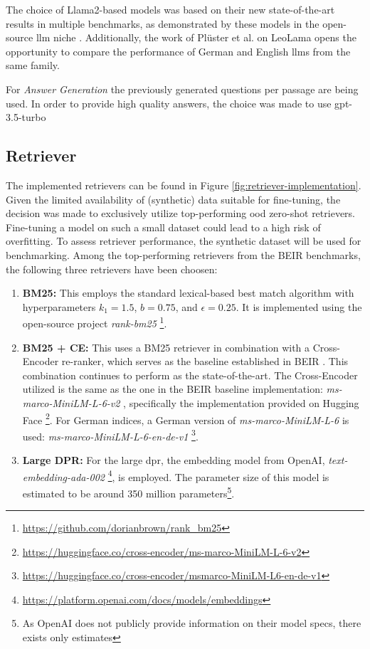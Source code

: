 The choice of Llama2-based models was based on their new state-of-the-art results in multiple benchmarks, as demonstrated by these models in the open-source \gls{llm} niche \cite{touvron_llama_2023}. Additionally, the work of Plüster et al. \cite{pluster_leolm_2023} on LeoLama opens the opportunity to compare the performance of German and English \gls{llm}s from the same family.

For \textit{Answer Generation} the previously generated questions per passage are being used. In order to provide high quality answers, the choice was made to use gpt-3.5-turbo

\subsection{Retriever}
\label{subsec:retriever-impl}

The implemented retrievers can be found in Figure \ref{fig:retriever-implementation}. Given the limited availability of (synthetic) data suitable for fine-tuning, the decision was made to exclusively utilize top-performing \gls{ood} zero-shot retrievers. Fine-tuning a model on such a small dataset could lead to a high risk of overfitting. To assess retriever performance, the synthetic dataset will be used for benchmarking. Among the top-performing retrievers from the BEIR benchmarks, the following three retrievers have been choosen:

\begin{enumerate}
    \item \textbf{BM25:} This employs the standard lexical-based best match algorithm with hyperparameters $k_1=1.5$, $b=0.75$, and $\epsilon=0.25$. It is implemented using the open-source project \textit{rank-bm25} \footnote{\url{https://github.com/dorianbrown/rank_bm25}}.
    \item \textbf{BM25 + CE:} This uses a BM25 retriever in combination with a Cross-Encoder re-ranker, which serves as the baseline established in BEIR \cite{thakur_beir_2021}. This combination continues to perform as the state-of-the-art. The Cross-Encoder utilized is the same as the one in the BEIR baseline implementation: \textit{ms-marco-MiniLM-L-6-v2} \cite{wang_minilm_2020}, specifically the implementation provided on Hugging Face \footnote{\url{https://huggingface.co/cross-encoder/ms-marco-MiniLM-L-6-v2}}. For German indices, a German version of \textit{ms-marco-MiniLM-L-6} is used: \textit{ms-marco-MiniLM-L-6-en-de-v1} \footnote{\url{https://huggingface.co/cross-encoder/msmarco-MiniLM-L6-en-de-v1}}.
    \item \textbf{Large DPR:} For the large \gls{dpr}, the embedding model from OpenAI, \textit{text-embedding-ada-002} \footnote{\url{https://platform.openai.com/docs/models/embeddings}}, is employed. The parameter size of this model is estimated to be around 350 million parameters\cite{muennighoff_sgpt_2022}\footnote{As OpenAI does not publicly provide information on their model specs, there exists only estimates}.
\end{enumerate}


